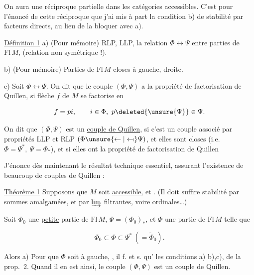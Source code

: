 


On aura une réciproque partielle dans les catégories accessibles. C'est pour l'énoncé de cette réciproque que j'ai mis à part la condition b) de stabilité par facteurs directs, au lieu de la bloquer avec a).

\uline{Définition 1} \quad a) (Pour mémoire) RLP, LLP, la relation $\Phi\longleftrightarrow\Psi$ entre parties de $\mathrm{Fl}\,M$, (relation non symétrique !).

b) (Pour mémoire) Parties de $\mathrm{Fl}\,M$ closes à gauche,   droite.

c) Soit $\Phi\longleftrightarrow\Psi$. On dit que le couple $(\Phi,\Psi)$ a la propriété de factorisation de Quillen, si \uline{} flèche $f$ de $M$ se factorise en

\[ f=pi,\qquad i\in\Phi,\ p\deleted{\unsure{\Psi}}\in\Psi. \]

On dit que $(\Phi,\Psi)$ est un \uline{couple de Quillen}, si \deleted{\unsure{$\Phi$}} c'est un couple associé par propriétés LLP et RLP $(\Phi\unsure{\leftarrow|\leftarrow\!\shortmid}\Psi)$,  et elles sont closes (i.e. $\Phi=\Psi^*,\ \Psi=\Phi_*$), et si elles ont la propriété de factorisation de Quillen

J'énonce dès maintenant le résultat technique essentiel, assurant l'existence de beaucoup de couples de Quillen :




\uline{Théorème 1} Supposons que $M$ soit \uline{accessible}, et  . (Il doit suffire stabilité par sommes amalgamées, et par $\varinjlim$ filtrantes, voire ordinales\ldots)

 Soit $\Phi_0$ une \uline{petite} partie de $\mathrm{Fl}\,M$,  $\Psi=(\Phi_0)_*$, et $\Phi$ une partie de $\mathrm{Fl}\,M$ telle que

\[ \Phi_0\subset\Phi\subset\Psi^*\ (= \widetilde{\Phi}_0). \]

Alors a) Pour que $\Phi$ soit   à gauche, , il f. et s. qu'  les conditions a) b),c), de la prop.~2. Quand il en est ainsi, le couple $(\Phi,\Psi)$ est un couple de Quillen.

